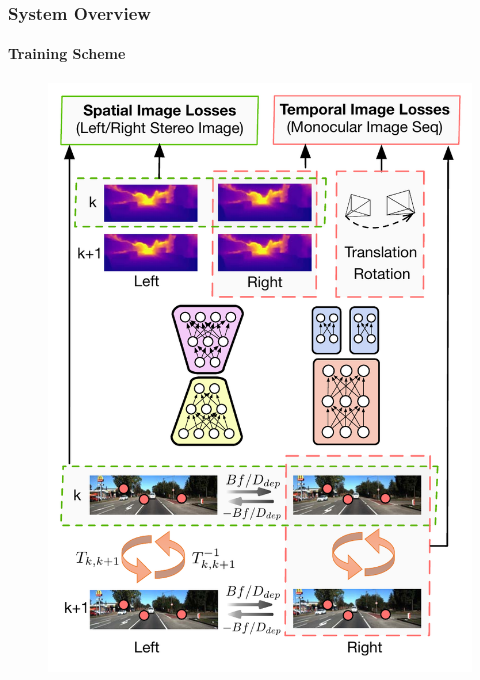 \begin{frame}
    \frametitle{System Overview}
    \framesubtitle{Training Scheme}
    \begin{figure}
        \includegraphics[scale=0.4]{images/TrainingScheme.pdf}
    \end{figure}
\end{frame}

